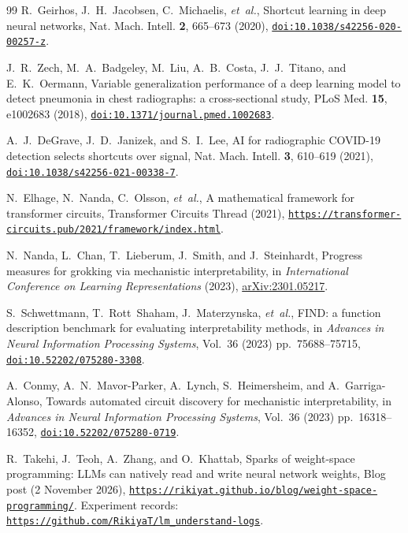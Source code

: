 \documentclass[aps,prx,reprint,superscriptaddress,nofootinbib]{revtex4-2}
\begin{document}
\begin{thebibliography}{99}
R.~Geirhos, J.~H.~Jacobsen, C.~Michaelis, \textit{et~al.}, Shortcut learning in deep neural
networks, Nat. Mach. Intell. \textbf{2}, \mbox{665--673} (2020),
\href{https://doi.org/10.1038/s42256-020-00257-z}{\nolinkurl{doi:10.1038/s42256-020-00257-z}}.

J.~R.~Zech, M.~A.~Badgeley, M.~Liu, A.~B.~Costa, J.~J.~Titano, and E.~K.~Oermann, Variable
generalization performance of a deep learning model to detect pneumonia in chest radiographs: a
cross-sectional study, PLoS Med. \textbf{15}, \mbox{e1002683} (2018),
\href{https://doi.org/10.1371/journal.pmed.1002683}{\nolinkurl{doi:10.1371/journal.pmed.1002683}}.

A.~J.~DeGrave, J.~D.~Janizek, and S.~I.~Lee, AI for radiographic COVID-19 detection selects
shortcuts over signal, Nat. Mach. Intell. \textbf{3}, \mbox{610--619} (2021),
\href{https://doi.org/10.1038/s42256-021-00338-7}{\nolinkurl{doi:10.1038/s42256-021-00338-7}}.

N.~Elhage, N.~Nanda, C.~Olsson, \textit{et~al.}, A mathematical framework for transformer circuits,
Transformer Circuits Thread (2021),
\href{https://transformer-circuits.pub/2021/framework/index.html}{\mbox{\nolinkurl{https://transformer-circuits.pub/}}\nolinkurl{2021/framework/index.html}}.

N.~Nanda, L.~Chan, T.~Lieberum, J.~Smith, and J.~Steinhardt, Progress measures for grokking via
mechanistic interpretability, in \textit{International Conference on Learning Representations}
(2023), \href{https://arxiv.org/abs/2301.05217}{arXiv:2301.05217}.

S.~Schwettmann, T.~Rott~Shaham, J.~Materzynska, \textit{et~al.}, FIND: a function description
benchmark for evaluating interpretability methods, in \textit{Advances in Neural Information
Processing Systems}, Vol.~36 (2023) pp.~\mbox{75688--75715},
\href{https://doi.org/10.52202/075280-3308}{\nolinkurl{doi:10.52202/075280-3308}}.

A.~Conmy, A.~N.~Mavor-Parker, A.~Lynch, S.~Heimersheim, and A.~Garriga-Alonso, Towards automated
circuit discovery for mechanistic interpretability, in \textit{Advances in Neural Information
Processing Systems}, Vol.~36 (2023) pp.~\mbox{16318--16352},
\href{https://doi.org/10.52202/075280-0719}{\nolinkurl{doi:10.52202/075280-0719}}.

R.~Takehi, J.~Teoh, A.~Zhang, and O.~Khattab, Sparks of weight-space programming: LLMs can natively
read and write neural network weights, Blog post (2 November 2026),
\href{https://rikiyat.github.io/blog/weight-space-programming/}{\mbox{\nolinkurl{https://rikiyat.github.io/}}\nolinkurl{blog/weight-space-programming/}}.
Experiment records:
\href{https://github.com/RikiyaT/lm_understand-logs}{\mbox{\nolinkurl{https://github.com/}}\nolinkurl{RikiyaT/lm_understand-logs}}.


\end{thebibliography}
\end{document}
